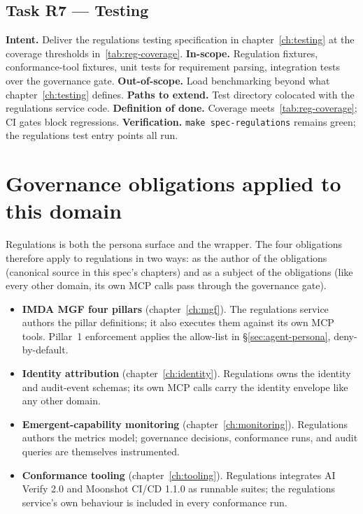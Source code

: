 \documentclass[11pt,a4paper,twoside]{report}
\begin{document}
\subsection*{Task R7 --- Testing}
\textbf{Intent.} Deliver the regulations testing specification in
chapter~\ref{ch:testing} at the coverage thresholds
in~\ref{tab:reg-coverage}.
\textbf{In-scope.} Regulation fixtures, conformance-tool fixtures,
unit tests for requirement parsing, integration tests over the
governance gate.
\textbf{Out-of-scope.} Load benchmarking beyond what
chapter~\ref{ch:testing} defines.
\textbf{Paths to extend.} Test directory colocated with the
regulations service code.
\textbf{Definition of done.} Coverage meets~\ref{tab:reg-coverage};
CI gates block regressions.
\textbf{Verification.} \texttt{make spec-regulations} remains green;
the regulations test entry points all run.


\section{Governance obligations applied to this domain}
\label{sec:agent-governance}
Regulations is both the persona surface and the wrapper. The four
obligations therefore apply to regulations in two ways: as the
author of the obligations (canonical source in this spec's chapters)
and as a subject of the obligations (like every other domain, its
own MCP calls pass through the governance gate).

\begin{itemize}
\item \textbf{IMDA MGF four pillars} (chapter~\ref{ch:mgf}). The
regulations service authors the pillar definitions; it also
executes them against its own MCP tools. Pillar~1 enforcement
applies the allow-list in \S\ref{sec:agent-persona},
deny-by-default.
\item \textbf{Identity attribution} (chapter~\ref{ch:identity}).
Regulations owns the identity and audit-event schemas; its own
MCP calls carry the identity envelope like any other domain.
\item \textbf{Emergent-capability monitoring}
(chapter~\ref{ch:monitoring}). Regulations authors the metrics
model; governance decisions, conformance runs, and audit queries
are themselves instrumented.
\item \textbf{Conformance tooling} (chapter~\ref{ch:tooling}).
Regulations integrates AI Verify 2.0 and Moonshot CI/CD 1.1.0
as runnable suites; the regulations service's own behaviour is
included in every conformance run.
\end{itemize}
\end{document}
